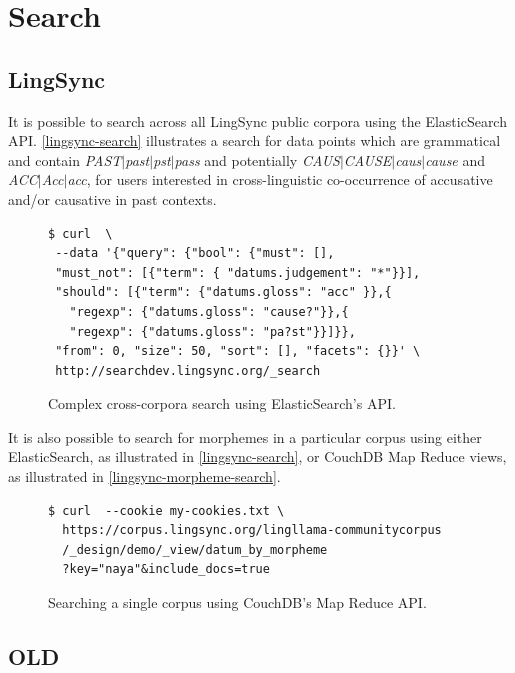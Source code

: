 \documentclass[11pt]{article}
\begin{document}
\section{Search}
\subsection{LingSync}

It is possible to search across all LingSync public corpora using the
ElasticSearch API. \autoref{lingsync-search} illustrates a search for data
points which are grammatical and contain \textit{PAST$|$past$|$pst$|$pass} and
potentially \textit{CAUS$|$CAUSE$|$caus$|$cause} and \textit{ACC$|$Acc$|$acc},
for users interested in cross-linguistic co-occurrence of accusative and/or
causative in past contexts.

\begin{figure}[h]
\scriptsize
\begin{verbatim}
$ curl  \
 --data '{"query": {"bool": {"must": [],
 "must_not": [{"term": { "datums.judgement": "*"}}],
 "should": [{"term": {"datums.gloss": "acc" }},{ 
   "regexp": {"datums.gloss": "cause?"}},{
   "regexp": {"datums.gloss": "pa?st"}}]}},
 "from": 0, "size": 50, "sort": [], "facets": {}}' \
 http://searchdev.lingsync.org/_search
\end{verbatim}
\normalsize
\caption{Complex cross-corpora search using ElasticSearch's API.}
\label{lingsync-search}
\end{figure}





It is also possible to search for morphemes in a particular corpus using either
ElasticSearch, as illustrated in \autoref{lingsync-search}, or CouchDB Map
Reduce views, as illustrated in \autoref{lingsync-morpheme-search}.

\begin{figure}[h]
\scriptsize
\begin{verbatim}
$ curl  --cookie my-cookies.txt \
  https://corpus.lingsync.org/lingllama-communitycorpus
  /_design/demo/_view/datum_by_morpheme
  ?key="naya"&include_docs=true
\end{verbatim}
\normalsize
\caption{Searching a single corpus using CouchDB's Map Reduce API.}
\label{lingsync-morpheme-search}
\end{figure}



\subsection{OLD}
\end{document}
